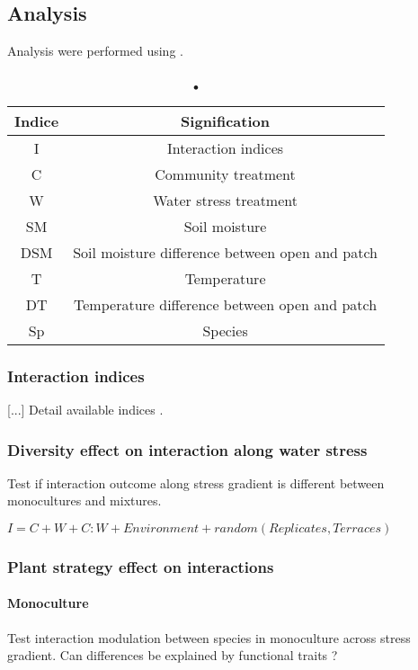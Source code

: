 \documentclass[12pt]{article} %
\begin{document}
\subsection{Analysis}

Analysis were performed using \citep{RCoreTeam2015}.
\begin{table}[h]
\begin{center}
\begin{tabular}{cc}
Indice & Signification\\
\hline
I & Interaction indices\\
C & Community treatment\\
W & Water stress treatment\\
SM & Soil moisture\\
DSM & Soil moisture difference between open and patch\\
T & Temperature \\
DT & Temperature difference between open and patch \\
Sp & Species \\
\hline 
\end{tabular}
\caption{•}
\end{center}
\end{table}

\subsubsection{Interaction indices}
[...] Detail available indices \citep{Seifan2010}.

\subsubsection{Diversity effect on interaction along water stress}
Test if interaction outcome along stress gradient is different between monocultures and mixtures.

$I= C + W + C:W + Environment + random(Replicates,Terraces)$

\subsubsection{Plant strategy effect on interactions}

\paragraph{Monoculture}
Test interaction modulation between species in monoculture across stress gradient. Can differences be explained by functional traits ?
\end{document}
